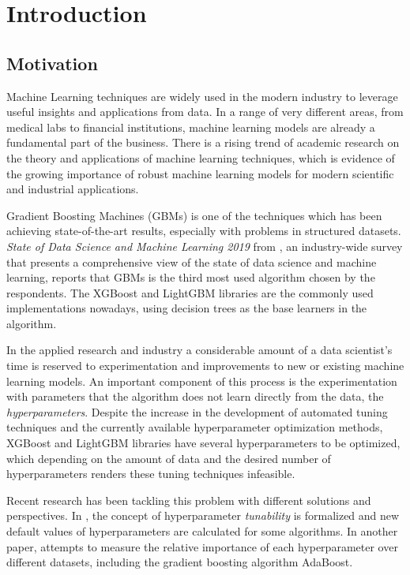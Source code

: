 \chapter{Introduction}
\label{cap:introduction}

\section{Motivation}
\label{sec:motivation}

Machine Learning techniques are widely used in the modern industry to leverage useful insights and applications from data. In a range of very different areas, from medical labs to financial institutions, machine learning models are already a fundamental part of the business. There is a rising trend of academic research on the theory and applications of machine learning techniques, which is evidence of the growing importance of robust machine learning models for modern scientific and industrial applications.

Gradient Boosting Machines (GBMs) is one of the techniques which has been achieving state-of-the-art results, especially with problems in structured datasets. \textit{State of Data Science and Machine Learning 2019} from \cite{kaggle:survey}, an industry-wide survey that presents a comprehensive view of the state of data science and machine learning, reports that GBMs is the third most used algorithm chosen by the respondents. The XGBoost and LightGBM libraries are the commonly used implementations nowadays, using decision trees as the base learners in the algorithm.

In the applied research and industry a considerable amount of a data scientist's time is reserved to experimentation and improvements to new or existing machine learning models. An important component of this process is the experimentation with parameters that the algorithm does not learn directly from the data, the \textit{hyperparameters}. Despite the increase in the development of automated tuning techniques and the currently available hyperparameter optimization methods, XGBoost and LightGBM libraries have several hyperparameters to be optimized, which depending on the amount of data and the desired number of hyperparameters renders these tuning techniques infeasible.

Recent research has been tackling this problem with different solutions and perspectives. In \cite{probst2018tunability}, the concept of hyperparameter \textit{tunability} is formalized and new default values of hyperparameters are calculated for some algorithms. In another paper, \cite{van2018hyperparameter} attempts to measure the relative importance of each hyperparameter over different datasets, including the gradient boosting algorithm AdaBoost.

